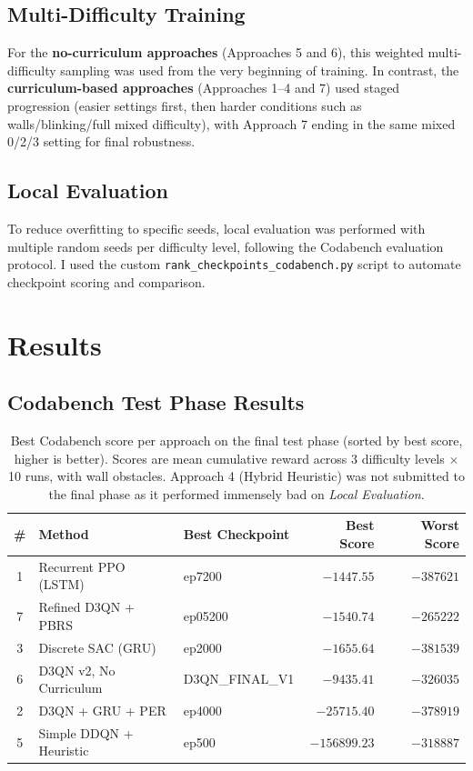 \documentclass[10.5pt, oneside]{article}
\begin{document}
\subsection{Multi-Difficulty Training}

For the \textbf{no-curriculum approaches} (Approaches 5 and 6), this weighted multi-difficulty sampling was used from the very beginning of training. In contrast, the \textbf{curriculum-based approaches} (Approaches 1--4 and 7) used staged progression (easier settings first, then harder conditions such as walls/blinking/full mixed difficulty), with Approach 7 ending in the same mixed 0/2/3 setting for final robustness.

\subsection{Local Evaluation}


To reduce overfitting to specific seeds, local evaluation was performed with multiple random seeds per difficulty level, following the Codabench evaluation protocol. I used the custom \texttt{rank\_checkpoints\_codabench.py} script to automate checkpoint scoring and comparison.

\section{Results}

\subsection{Codabench Test Phase Results}

\begin{table}[H]
\centering
\small
\begin{tabular}{c l l r r}
\toprule
\textbf{\#} & \textbf{Method} & \textbf{Best Checkpoint} & \textbf{Best Score} & \textbf{Worst Score} \\
\midrule
1 & Recurrent PPO (LSTM) & ep7200 & \textbf{$-1447.55$} & $-387621$ \\
7 & Refined D3QN + PBRS & ep05200 & $-1540.74$ & $-265222$ \\
3 & Discrete SAC (GRU) & ep2000 & $-1655.64$ & $-381539$ \\
6 & D3QN v2, No Curriculum & D3QN\_FINAL\_V1 & $-9435.41$ & $-326035$ \\
2 & D3QN + GRU + PER & ep4000 & $-25715.40$ & $-378919$ \\
5 & Simple DDQN + Heuristic & ep500 & $-156899.23$ & $-318887$ \\
\bottomrule
\end{tabular}
\caption{Best Codabench score per approach on the final test phase (sorted by best score, higher is better). Scores are mean cumulative reward across 3 difficulty levels $\times$ 10 runs, with wall obstacles. Approach 4 (Hybrid Heuristic) was not submitted to the final phase as it performed immensely bad on \textit{Local Evaluation}.}
\label{tab:results}
\end{table}
\end{document}
